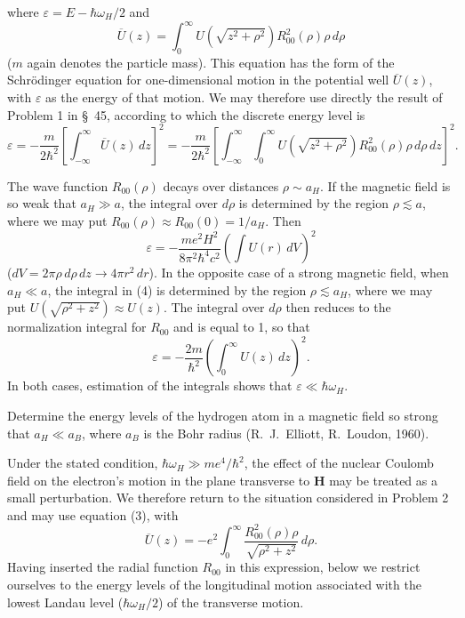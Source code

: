 where $\varepsilon=E-\hbar\omega_H/2$ and
\[
 \overline U(z)=\int_0^\infty U\left(\sqrt{z^2+\rho^2}\right)R_{00}^2(\rho)\rho\,d\rho
\]
($m$ again denotes the particle mass). This equation has the form of the Schrödinger equation for one-dimensional motion in the potential well $\overline U(z)$, with $\varepsilon$ as the energy of that motion. We may therefore use directly the result of Problem 1 in \S~45, according to which the discrete energy level is
\begin{equation}
 \varepsilon=-\frac m{2\hbar^2}\left[\int_{-\infty}^{\infty}\overline U(z)\,dz\right]^2=-\frac m{2\hbar^2}\left[\int_{-\infty}^{\infty}\int_0^\infty U\left(\sqrt{z^2+\rho^2}\right)R_{00}^2(\rho)\rho\,d\rho\,dz\right]^2.
 \tag{4}
\end{equation}

The wave function $R_{00}(\rho)$ decays over distances $\rho\sim a_H$. If the magnetic field is so weak that $a_H\gg a$, the integral over $d\rho$ is determined by the region $\rho\lesssim a$, where we may put $R_{00}(\rho)\approx R_{00}(0)=1/a_H$. Then
\begin{equation}
 \varepsilon=-\frac{me^2H^2}{8\pi^2\hbar^4c^2}\left(\int U(r)\,dV\right)^2
 \tag{5}
\end{equation}
($dV=2\pi\rho\,d\rho\,dz\to4\pi r^2\,dr$). In the opposite case of a strong magnetic field, when $a_H\ll a$, the integral in (4) is determined by the region $\rho\lesssim a_H$, where we may put $U(\sqrt{\rho^2+z^2})\approx U(z)$. The integral over $d\rho$ then reduces to the normalization integral for $R_{00}$ and is equal to 1, so that
\begin{equation}
 \varepsilon=-\frac{2m}{\hbar^2}\left(\int_0^\infty U(z)\,dz\right)^2.
 \tag{6}
\end{equation}
In both cases, estimation of the integrals shows that $\varepsilon\ll\hbar\omega_H$.

 Determine the energy levels of the hydrogen atom in a magnetic field so strong that $a_H\ll a_B$, where $a_B$ is the Bohr radius (R.~J.~Elliott, R.~Loudon, 1960).

\SolutionHeading Under the stated condition, $\hbar\omega_H\gg me^4/\hbar^2$, the effect of the nuclear Coulomb field on the electron's motion in the plane transverse to $\mathbf H$ may be treated as a small perturbation. We therefore return to the situation considered in Problem 2 and may use equation (3), with
\begin{equation}
 \overline U(z)=-e^2\int_0^\infty\frac{R_{00}^2(\rho)\rho}{\sqrt{\rho^2+z^2}}\,d\rho.
 \tag{7}
\end{equation}
Having inserted the radial function $R_{00}$ in this expression, below we restrict ourselves to the energy levels of the longitudinal motion associated with the lowest Landau level ($\hbar\omega_H/2$) of the transverse motion.

